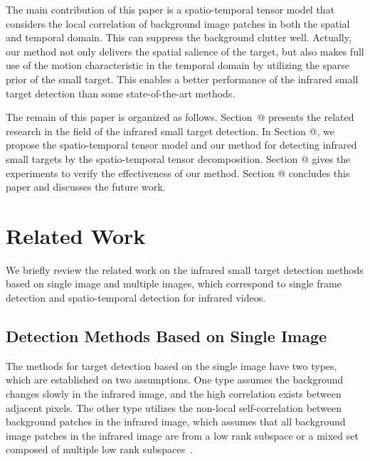 \documentclass[journal]{IEEEtran}
\makeatletter
\newcommand{\Rmnum}[1]{\expandafter\@slowromancap\romannumeral #1@}
\makeatother
\begin{document}
The main contribution of this paper is a spatio-temporal tensor model that considers the local correlation of background image patches in both the spatial and temporal domain. This can suppress the background clutter well. Actually, our method not only delivers the spatial salience of the target, but also makes full use of the motion characteristic in the temporal domain by utilizing the sparse prior of the small target.
This enables a better performance of the infrared small target detection than some state-of-the-art methods.

The remain of this paper is organized as follows. Section~\Rmnum{2} presents the related research in the field of the infrared small target detection. In Section \Rmnum{3}, we propose the spatio-temporal tensor model and our method for detecting infrared small targets by the spatio-temporal tensor decomposition. Section \Rmnum{4} gives the experiments to verify the effectiveness of our method. Section \Rmnum{5} concludes this paper and discusses the future work.

%
%
\section{Related Work}

We briefly review the related work on the infrared small target detection methods based on single image and multiple images, which correspond to single frame detection and spatio-temporal detection for infrared videos.

\subsection{Detection Methods Based on Single Image}

The methods for target detection based on the single image have two types, which are established on two assumptions. One type assumes the background changes slowly in the infrared image, and the high correlation exists between adjacent pixels. The other type utilizes the non-local self-correlation between background patches in the infrared image, which assumes that all background image patches in the infrared image are from a low rank subspace or a mixed set composed of multiple low rank subspaces~\cite{liu2013robust}.
\end{document}

